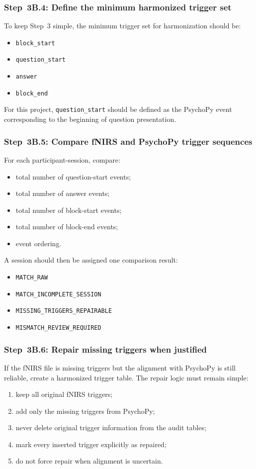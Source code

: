 \subsubsection{Step~3B.4: Define the minimum harmonized trigger set}
To keep Step~3 simple, the minimum trigger set for harmonization should be:
\begin{itemize}
    \item \texttt{block\_start}
    \item \texttt{question\_start}
    \item \texttt{answer}
    \item \texttt{block\_end}
\end{itemize}

For this project, \texttt{question\_start} should be defined as the PsychoPy event corresponding to the
beginning of question presentation.

\subsubsection{Step~3B.5: Compare fNIRS and PsychoPy trigger sequences}
For each participant-session, compare:
\begin{itemize}
    \item total number of question-start events;
    \item total number of answer events;
    \item total number of block-start events;
    \item total number of block-end events;
    \item event ordering.
\end{itemize}

A session should then be assigned one comparison result:
\begin{itemize}
    \item \texttt{MATCH\_RAW}
    \item \texttt{MATCH\_INCOMPLETE\_SESSION}
    \item \texttt{MISSING\_TRIGGERS\_REPAIRABLE}
    \item \texttt{MISMATCH\_REVIEW\_REQUIRED}
\end{itemize}

\subsubsection{Step~3B.6: Repair missing triggers when justified}
If the fNIRS file is missing triggers but the alignment with PsychoPy is still reliable,
create a harmonized trigger table.
The repair logic must remain simple:
\begin{enumerate}
    \item keep all original fNIRS triggers;
    \item add only the missing triggers from PsychoPy;
    \item never delete original trigger information from the audit tables;
    \item mark every inserted trigger explicitly as repaired;
    \item do not force repair when alignment is uncertain.
\end{enumerate}


